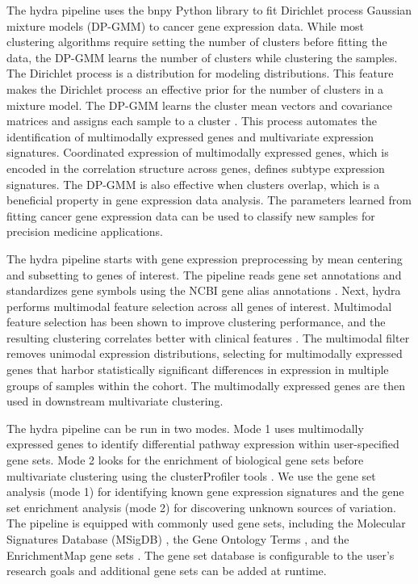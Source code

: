 \documentclass[10pt,letterpaper]{article}
\begin{document}
The hydra pipeline uses the bnpy Python library to fit Dirichlet process Gaussian mixture models (DP-GMM) to cancer gene expression data. While most clustering algorithms require setting the number of clusters before fitting the data, the DP-GMM learns the number of clusters while clustering the samples. The Dirichlet process is a distribution for modeling distributions. This feature makes the Dirichlet process an effective prior for the number of clusters in a mixture model. The DP-GMM learns the cluster mean vectors and covariance matrices and assigns each sample to a cluster \cite{hughesBnpyReliableScalable}. This process automates the identification of multimodally expressed genes and multivariate expression signatures. Coordinated expression of multimodally expressed genes, which is encoded in the correlation structure across genes, defines subtype expression signatures. The DP-GMM is also effective when clusters overlap, which is a beneficial property in gene expression data analysis. The parameters learned from fitting cancer gene expression data can be used to classify new samples for precision medicine applications.
 
The hydra pipeline starts with gene expression preprocessing by mean centering and subsetting to genes of interest. The pipeline reads gene set annotations and standardizes gene symbols using the NCBI gene alias annotations \cite{benson2012genbank}. Next, hydra performs multimodal feature selection across all genes of interest. Multimodal feature selection has been shown to improve clustering performance, and the resulting clustering correlates better with clinical features \cite{yiliMultimodalityCriterionFeature2005}. The multimodal filter removes unimodal expression distributions, selecting for multimodally expressed genes that harbor statistically significant differences in expression in multiple groups of samples within the cohort. The multimodally expressed genes are then used in downstream multivariate clustering.

The hydra pipeline can be run in two modes. Mode 1 uses multimodally expressed genes to identify differential pathway expression within user-specified gene sets. Mode 2 looks for the enrichment of biological gene sets before multivariate clustering using the clusterProfiler tools \cite{yuClusterProfilerPackageComparing2012}. We use the gene set analysis (mode 1) for identifying known gene expression signatures and the gene set enrichment analysis (mode 2) for discovering unknown sources of variation. The pipeline is equipped with commonly used gene sets, including the Molecular Signatures Database (MSigDB) \cite{liberzonMolecularSignaturesDatabase2011}, the Gene Ontology Terms \cite{ashburner2000gene, gene2018gene}, and the EnrichmentMap gene sets \cite{merico2010enrichment}. The gene set database is configurable to the user’s research goals and additional gene sets can be added at runtime.
\end{document}
